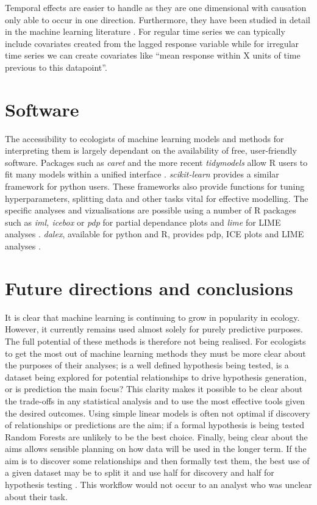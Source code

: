 \documentclass[12pt,]{article}
\begin{document}
Temporal effects are easier to handle as they are one dimensional with causation only able to occur in one direction.
Furthermore, they have been studied in detail in the machine learning literature \citep{jeong2008non}.
For regular time series we can typically include covariates created from the lagged response variable while for irregular time series we can create covariates like ``mean response within X units of time previous to this datapoint''.

\section{Software}

The accessibility to ecologists of machine learning models and methods for interpreting them is largely dependant on the availability of free, user-friendly software. 
Packages such as \emph{caret} and the more recent \emph{tidymodels} allow R users to fit many models within a unified interface \citep{caret, tidymodels}.
\emph{scikit-learn} provides a similar framework for python users.
These frameworks also provide functions for tuning hyperparameters, splitting data and other tasks vital for effective modelling.
The specific analyses and vizualisations are possible using a number of R packages such as \emph{iml, icebox} or \emph{pdp} for partial dependance plots and \emph{lime} for LIME analyses \citep{iml, lime, icebox, pdp}.
\emph{dalex}, available for python and R, provides pdp, ICE plots and LIME analyses \citep{dalex}.


\section{Future directions and conclusions}\label{future-directions-and-conclusions}

It is clear that machine learning is continuing to grow in popularity in ecology.
However, it currently remains used almost solely for purely predictive purposes.
The full potential of these methods is therefore not being realised.
For ecologists to get the most out of machine learning methods they must be more clear about the purposes of their analyses; is a well defined hypothesis being tested, is a dataset being explored for potential relationships to drive hypothesis generation, or is prediction the main focus?
This clarity makes it possible to be clear about the trade-offs in any statistical analysis and to use the most effective tools given the desired outcomes.
Using simple linear models is often not optimal if discovery of relationships or predictions are the aim; if a formal hypothesis is being tested Random Forests are unlikely to be the best choice.
Finally, being clear about the aims allows sensible planning on how data will be used in the longer term.
If the aim is to discover some relationships and then formally test them, the best use of a given dataset may be to split it and use half for discovery and half for hypothesis testing \citep{gelman2014statistical, nosek2012scientific}.
This workflow would not occur to an analyst who was unclear about their task.
\end{document}
